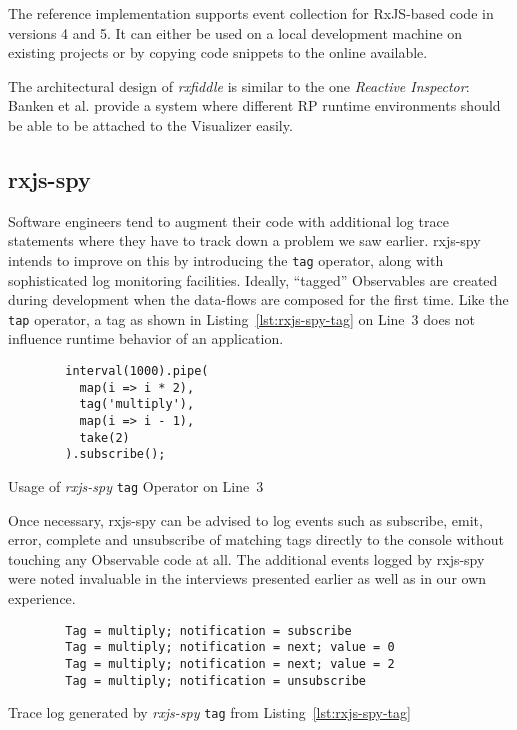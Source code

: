 \documentclass[12pt,a4paper]{article}
\begin{document}
The reference implementation supports event collection for RxJS-based code in versions 4 and 5. It can either be used on a local development machine on existing projects or by copying code snippets to the online available.

The architectural design of \emph{rxfiddle} is similar to the one \emph{Reactive Inspector}: Banken et al. provide a system where different RP runtime environments should be able to be attached to the Visualizer easily.

\subsection{rxjs-spy}

Software engineers tend to augment their code with additional log trace statements where they have to track down a problem we saw earlier. rxjs-spy\cite{rxjsspy} intends to improve on this by introducing the \texttt{tag} operator, along with sophisticated log monitoring facilities. Ideally, ``tagged'' Observables are created during development when the data-flows are composed for the first time. Like the \texttt{tap} operator, a tag as shown in Listing~\ref{lst:rxjs-spy-tag} on Line~3 does not influence runtime behavior of an application.

\begin{listing}[H]
	\begin{verbatim}
		interval(1000).pipe(
		  map(i => i * 2),
		  tag('multiply'),
		  map(i => i - 1),
		  take(2)
		).subscribe();
	\end{verbatim}
	\caption{Usage of \emph{rxjs-spy} \texttt{tag} Operator on Line~3}
	\label{lst:rxjs-spy-tag}
\end{listing}

Once necessary, rxjs-spy can be advised to log events such as subscribe, emit, error, complete and unsubscribe of matching tags directly to the console without touching any Observable code at all. The additional events logged by rxjs-spy were noted invaluable in the interviews presented earlier as well as in our own experience.

\begin{listing}[H]
	\begin{verbatim}
		Tag = multiply; notification = subscribe
		Tag = multiply; notification = next; value = 0
		Tag = multiply; notification = next; value = 2
		Tag = multiply; notification = unsubscribe
	\end{verbatim}
	\caption{Trace log generated by \emph{rxjs-spy} \texttt{tag} from Listing~\ref{lst:rxjs-spy-tag}}
	\label{lst:rxjs-spy-log}
\end{listing}
\end{document}

